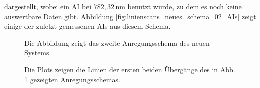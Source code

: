 dargestellt, wobei ein AI bei $782,32\,$nm benutzt wurde, zu dem es noch keine
auswertbare Daten gibt. Abbildung
\ref{fig:linienscans_neues_schema_02_AIs} zeigt einige der zuletzt gemessenen
AIs aus diesem Schema.
\begin{figure}[h]
 	\centering
	\caption[Anregungsschema, neu (1)]{Die Abbildung zeigt das
	zweite Anregungsschema des neuen Systems.}\label{fig:anregungsschema_neu_02}
\end{figure}
\begin{figure}[hp]
 	\centering
 	\footnotesize
	\caption[erster und zweiter Anregungsschritt, neues System, Schema (2)]{Die
	Plots zeigen die Linien der ersten beiden Übergänge des in Abb.
	\ref{fig:anregungsschema_neu_02} gezeigten Anregungsschemas.}
	\label{fig:linienscans_neues_schema_02}
\end{figure}
